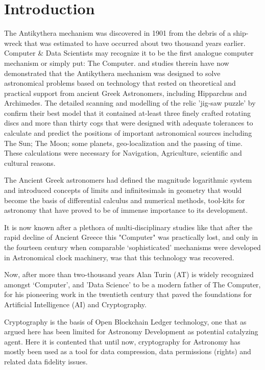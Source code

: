 \documentclass[final,5p,times,twocolumn,authoryear]{elsarticle}
\begin{document}
\section{Introduction}
\label{sec:intro}
%
 The Antikythera mechanism was discovered in 1901 from the debris of a ship-wreck that was estimated to have occurred about two thousand years earlier. Computer \& Data Scientists may recognize it to be the first analogue computer mechanism or simply put: The Computer. \citet{Freeth2021} and studies therein have now demonstrated that the Antikythera mechanism was designed to solve astronomical problems based on technology that rested on theoretical and practical support from ancient Greek Astronomers, including Hipparchus and Archimedes. The detailed scanning and modelling of the relic 'jig-saw puzzle' by \citet{freeth2021} confirm their best model that it contained at-least three finely crafted rotating discs and more than thirty cogs that were designed with adequate tolerances to calculate and predict the positions of important astronomical sources including The Sun; The Moon; some planets, geo-localization and the passing of time. These calculations were necessary for Navigation, Agriculture, scientific and cultural reasons. 
 
 The Ancient Greek astronomers had defined the magnitude logarithmic system and introduced concepts of limits and infinitesimals in geometry that would become the basis of differential calculus and numerical methods, tool-kits for astronomy that have proved to be of immense importance to its development.
 
 It is now known after a plethora of multi-disciplinary studies like \citet{Freeth2021} that after the rapid decline of Ancient Greece this "Computer" was practically lost, and only in the fourteen century when comparable `sophisticated' mechanisms were developed in Astronomical clock machinery, was that this technology was recovered. 
 
 Now, after more than two-thousand years Alan Turin (AT) is widely recognized amongst  `Computer', and 'Data Science' to be a modern father of The Computer, for his pioneering  work in the twentieth century that paved the foundations for Artificial Intelligence (AI) and Cryptography. 
 
Cryptography is the basis of Open Blockchain Ledger technology, one that as argued here has been limited for Astronomy Development as potential catalyzing agent. Here it is contented that until now, cryptography for Astronomy has mostly been used as a tool for data compression, data permissions (rights) and related data fidelity issues. 
\end{document}
